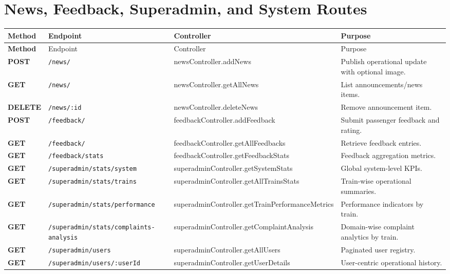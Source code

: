 \documentclass[12pt,a4paper]{report}
\renewcommand{\toprule}{\hline\hline}
\renewcommand{\midrule}{\hline}
\begin{document}
\section{News, Feedback, Superadmin, and System Routes}
\begin{longtable}{>{\bfseries}p{} p{} p{} p{}}
\toprule
\rowcolor{TableHeader}
\textcolor{TableHeaderText}{Method} & \textcolor{TableHeaderText}{Endpoint} & \textcolor{TableHeaderText}{Controller} & \textcolor{TableHeaderText}{Purpose} \\
\midrule
\endfirsthead
\toprule
\rowcolor{TableHeader}
\textcolor{TableHeaderText}{Method} & \textcolor{TableHeaderText}{Endpoint} & \textcolor{TableHeaderText}{Controller} & \textcolor{TableHeaderText}{Purpose} \\
\midrule
\endhead
POST & \texttt{/news/} & newsController.addNews & Publish operational update with optional image. \\
GET & \texttt{/news/} & newsController.getAllNews & List announcements/news items. \\
DELETE & \texttt{/news/:id} & newsController.deleteNews & Remove announcement item. \\
POST & \texttt{/feedback/} & feedbackController.addFeedback & Submit passenger feedback and rating. \\
GET & \texttt{/feedback/} & feedbackController.getAllFeedbacks & Retrieve feedback entries. \\
GET & \texttt{/feedback/stats} & feedbackController.getFeedbackStats & Feedback aggregation metrics. \\
GET & \texttt{/superadmin/stats/system} & superadminController.getSystemStats & Global system-level KPIs. \\
GET & \texttt{/superadmin/stats/trains} & superadminController.getAllTrainsStats & Train-wise operational summaries. \\
GET & \texttt{/superadmin/stats/performance} & superadminController.getTrainPerformanceMetrics & Performance indicators by train. \\
GET & \texttt{/superadmin/stats/complaints-analysis} & superadminController.getComplaintAnalysis & Domain-wise complaint analytics by train. \\
GET & \texttt{/superadmin/users} & superadminController.getAllUsers & Paginated user registry. \\
GET & \texttt{/superadmin/users/:userId} & superadminController.getUserDetails & User-centric operational history. \\

\end{longtable}
\end{document}
